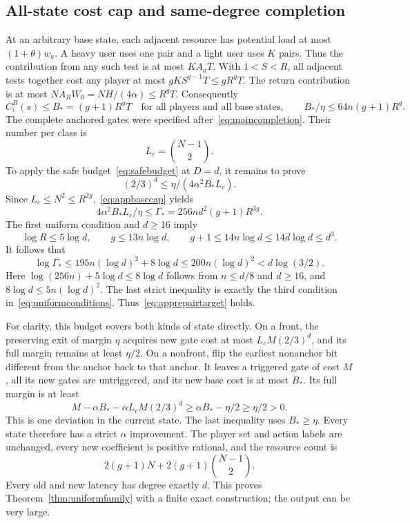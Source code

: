 \documentclass[manuscript,review,anonymous]{acmart}
\begin{document}
\subsection{All-state cost cap and same-degree completion}\label{app:samedegree}
At an arbitrary base state, each adjacent resource has potential load at most $(1+\theta)w_a$. A heavy user uses one pair and a light user uses $K$ pairs. Thus the contribution from any such test is at most $KA_aT$. With $1<S<R$, all adjacent tests together cost any player at most $gKS^{g-1}T\le gR^gT$. The return contribution is at most $NA_RW_0=NH/(4\alpha)\le R^gT$. Consequently
\begin{equation}\label{eq:appbasecap}
 C_i^B(s)\le B_*=(g+1)R^gT
 \quad\text{for all players and all base states},\qquad
 B_*/\eta\le64n(g+1)R^g.
\end{equation}
The complete anchored gates were specified after~\eqref{eq:maincompletion}. Their number per class is
\begin{equation}\label{eq:appclocks}
 L_c=\binom{N-1}{2}.
\end{equation}
To apply the safe budget~\eqref{eq:safebudget} at $D=d$, it remains to prove
\begin{equation}\label{eq:apprepairtarget}
 (2/3)^d\le\eta/(4\alpha^2B_*L_c).
\end{equation}
Since $L_c\le N^2\le R^{2g}$,~\eqref{eq:appbasecap} yields
\begin{equation}\label{eq:appGamma}
 4\alpha^2B_*L_c/\eta\le
 \Gamma_*=256nd^2(g+1)R^{3g}.
\end{equation}
The first uniform condition and $d\ge16$ imply
\[
 \log R\le5\log d,\qquad g\le13n\log d,\qquad
 g+1\le14n\log d\le14d\log d\le d^3.
\]
It follows that
\begin{equation}\label{eq:appGammalog}
 \log\Gamma_*\le195n(\log d)^2+8\log d
 \le200n(\log d)^2<d\log(3/2).
\end{equation}
Here $\log(256n)+5\log d\le8\log d$ follows from $n\le d/8$ and $d\ge16$, and $8\log d\le5n(\log d)^2$. The last strict inequality is exactly the third condition in~\eqref{eq:uniformconditions}. Thus~\eqref{eq:apprepairtarget} holds.

For clarity, this budget covers both kinds of state directly. On a front, the preserving exit of margin $\eta$ acquires new gate cost at most $L_cM(2/3)^d$, and its full margin remains at least $\eta/2$. On a nonfront, flip the earliest nonanchor bit different from the anchor back to that anchor. It leaves a triggered gate of cost $M$, all its new gates are untriggered, and its new base cost is at most $B_*$. Its full margin is at least
\[
 M-\alpha B_*-\alpha L_cM(2/3)^d
 \ge\alpha B_*-\eta/2\ge\eta/2>0.
\]
This is one deviation in the current state. The last inequality uses $B_*\ge\eta$. Every state therefore has a strict $\alpha$ improvement. The player set and action labels are unchanged, every new coefficient is positive rational, and the resource count is
\begin{equation}\label{eq:appresourcecount}
 2(g+1)N+2(g+1)\binom{N-1}{2}.
\end{equation}
Every old and new latency has degree exactly $d$. This proves Theorem~\ref{thm:uniformfamily} with a finite exact construction; the output can be very large.
\end{document}
